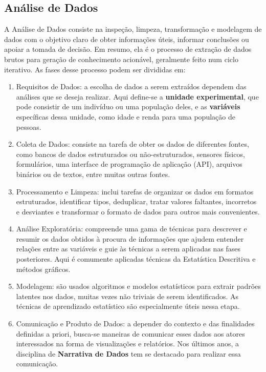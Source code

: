 \subsection{Análise de Dados}

A Análise de Dados consiste na inspeção, limpeza, transformação e modelagem de dados
com o objetivo claro de obter informações úteis, informar conclusões ou apoiar a
tomada de decisão. Em resumo, ela é o processo de extração de dados brutos para
geração de conhecimento acionável, geralmente feito num ciclo iterativo. As fases desse
processo podem ser divididas em:

\begin{enumerate}
	\item Requisitos de Dados: a escolha de dados a serem extraídos dependem das
	      análises que se deseja realizar. Aqui define-se a \textbf{unidade experimental},
	      que pode consistir de um indivíduo ou uma população deles, e as \textbf{variáveis}
	      específicas dessa unidade, como idade e renda para uma população de pessoas.

	\item Coleta de Dados: consiste na tarefa de obter os dados de diferentes fontes,
	      como bancos de dados estruturados ou não-estruturados, sensores físicos, formulários,
	      uma interface de programação de aplicação (API), arquivos binários ou de textos, entre
	      muitas outras fontes.

	\item Processamento e Limpeza: inclui tarefas de organizar os dados em formatos
	      estruturados, identificar tipos, deduplicar, tratar valores faltantes, incorretos
	      e desviantes e transformar o formato de dados para outros mais convenientes.

	\item Análise Exploratória: compreende uma gama de técnicas para descrever e resumir
	      os dados obtidos à procura de informações que ajudem entender relações entre as
	      variáveis e guie às técnicas a serem aplicadas nas fases posteriores. Aqui
	      é comumente aplicadas técnicas da Estatística Descritiva e métodos gráficos.

	\item Modelagem: são usados algoritmos e modelos estatísticos para extrair padrões
	      latentes nos dados, muitas vezes não triviais de serem identificados. As
	      técnicas de aprendizado estatístico são especialmente úteis nessa etapa.

	\item Comunicação e Produto de Dados: a depender do contexto e das finalidades definidas
	      a priori, busca-se maneiras de comunicar esses dados aos atores interessados na
	      forma de visualizações e relatórios. Nos últimos anos, a disciplina de
	      \textbf{Narrativa de Dados} tem se destacado para realizar essa comunicação.
\end{enumerate}

